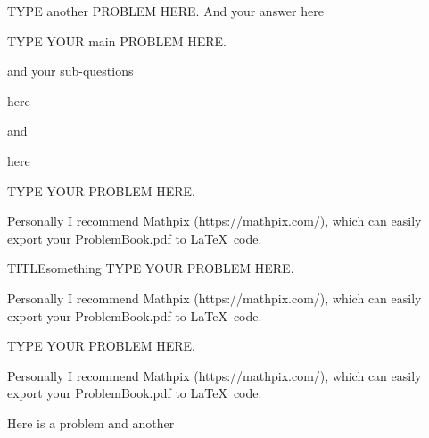 \documentclass{yourmommaaintgotno}
\begin{document}
\begin{problem}{TYPE another PROBLEM HERE.}
And your answer here
\end{problem}

\begin{mproblem}{TYPE YOUR main PROBLEM HERE.}
  \item and your sub-questions
  \item here
  \item and
  \item here
\end{mproblem}

\begin{Exercise}
  TYPE YOUR PROBLEM HERE.
\end{Exercise}
\begin{Solution}
Personally I recommend Mathpix (https://mathpix.com/),
which can easily export your ProblemBook.pdf to \LaTeX \ code.
\end{Solution}

\begin{exercise}{TITLE}{something}
  TYPE YOUR PROBLEM HERE.
\end{exercise}
\begin{solution}
Personally I recommend Mathpix (https://mathpix.com/),
which can easily export your ProblemBook.pdf to \LaTeX \ code.
\end{solution}

\begin{exercise}
  TYPE YOUR PROBLEM HERE.
\end{exercise}
\begin{Solution}
Personally I recommend Mathpix (https://mathpix.com/),
which can easily export your ProblemBook.pdf to \LaTeX \ code.
\end{Solution}


\begin{problem}{Here is a problem}
  and another
\end{problem}
\end{document}
